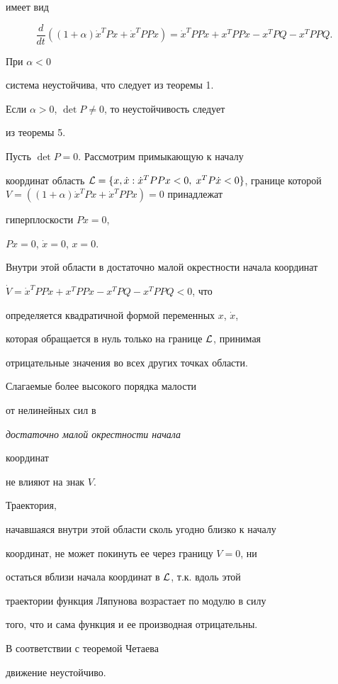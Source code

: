 имеет вид


$$


\frac{d}{dt}((1+\alpha )\Dot{x}^{T}Px+ \Dot{x}^{T}PPx)


= \Dot{x}^{T}PP\Dot{x}+x^{T}PPx-x^{T}PQ -x^{T}PPQ.


$$


При $\alpha<0$


система неустойчива, что следует из теоремы 1.


Если $ \alpha >0$, $\det P \ne 0$, то неустойчивость следует


из теоремы 5.


Пусть $\det P=0$. Рассмотрим примыкающую к началу


координат область ${\cal L}=\{x,\Dot x : \Dot{x}^{T}PPx<0,\; x^{T}P


\Dot{x}<0 \} $, границе которой $V=


((1+\alpha )\Dot{x}^{T}Px+ \Dot{x}^{T}PPx)=0$ принадлежат


гиперплоскости $ P\Dot x=0$,


$Px=0$, $\Dot x=0$, $x=0$.


Внутри этой области в достаточно малой окрестности начала координат


$\Dot V=\Dot{x}^{T}PP\Dot{x}+x^{T}PPx-x^{T}PQ -x^{T}PPQ<0$, что


определяется квадратичной формой переменных $x$, $\Dot x$,


которая обращается в нуль только на границе ${\cal L}$, принимая


отрицательные значения во всех других точках области.


Слагаемые более высокого порядка малости


от нелинейных сил в {\it достаточно малой окрестности начала


координат} не влияют на знак $V$.


Траектория,


начавшаяся внутри этой области сколь угодно близко к началу


координат, не может покинуть ее через границу $V=0$, ни


остаться вблизи начала координат в ${\cal L}$, т.к. вдоль этой


траектории функция Ляпунова возрастает по модулю в силу


того, что и сама функция и ее производная отрицательны.


В соответствии с теоремой Четаева


движение неустойчиво.





